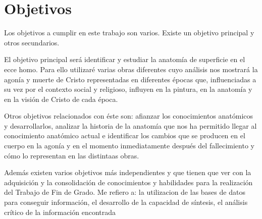 \section{Objetivos}
Los objetivos a cumplir en este trabajo son varios. Existe un objetivo principal y otros secundarios.

El objetivo principal será identificar y estudiar la anatomía de superficie en el ecce homo. Para ello utilizaré varias obras diferentes cuyo análisis nos mostrará la agonía y muerte de Cristo representadas en diferentes épocas que, influenciadas a su vez por el contexto social y religioso, influyen en la pintura, en la anatomía y en la visión de Cristo de cada época.

Otros objetivos relacionados con éste son: afianzar los conocimientos anatómicos y desarrollarlos, analizar la historia de la anatomía que nos ha permitido llegar al conocimiento anatómico actual e identificar los cambios que se producen en el cuerpo en la agonía y en el momento inmediatamente después del fallecimiento y cómo lo representan en las distintaas obras.

Además existen varios objetivos más independientes y que tienen que ver con la adquisición y la consolidación de conocimientos y habilidades para la realización del Trabajo de Fin de Grado. Me refiero a: la utilizacion de las bases de datos para conseguir información, el desarrollo de la capacidad de síntesis, el análisis crítico de la información encontrada 